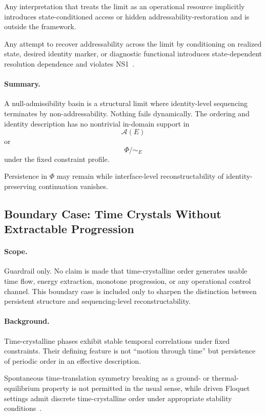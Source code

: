\documentclass[aps,prx,onecolumn,11pt]{revtex4-2}
\theoremstyle{plain}
\theoremstyle{definition}
\theoremstyle{remark}
\begin{document}
Any interpretation that treats the limit as an operational resource
implicitly introduces state-conditioned access or hidden
addressability-restoration and is outside the framework.

Any attempt to recover addressability across the limit by conditioning
on realized state, desired identity marker, or diagnostic functional
introduces state-dependent resolution dependence and violates
NS1~\cite{Gisin1989,Gisin1990}.

\paragraph{Summary.}

A null-admissibility basin is a structural limit where identity-level
sequencing terminates by non-addressability. Nothing fails dynamically.
The ordering and identity description has no nontrivial in-domain
support in
\[
\mathcal A(E)
\]
or
\[
\Phi/{\sim_E}
\]
under the fixed constraint profile.

Persistence in \(\Phi\) may remain while interface-level
reconstructability of identity-preserving continuation vanishes.

\subsection{Boundary Case: Time Crystals Without Extractable Progression}
\label{subsubsec:time_crystals_no_progress}

\paragraph{Scope.}

Guardrail only. No claim is made that time-crystalline order generates
usable time flow, energy extraction, monotone progression, or any
operational control channel. This boundary case is included only to
sharpen the distinction between persistent structure and
sequencing-level reconstructability.

\paragraph{Background.}

Time-crystalline phases exhibit stable temporal correlations under
fixed constraints. Their defining feature is not ``motion through
time'' but persistence of periodic order in an effective description.

Spontaneous time-translation symmetry breaking as a ground- or
thermal-equilibrium property is not permitted in the usual sense, while
driven Floquet settings admit discrete time-crystalline order under
appropriate stability conditions~\cite{Wilczek2012,Bruno2013NoGoTimeCrystals,
WatanabeOshikawa2015,ElseBauerNayak2016Floquet}.
\end{document}
